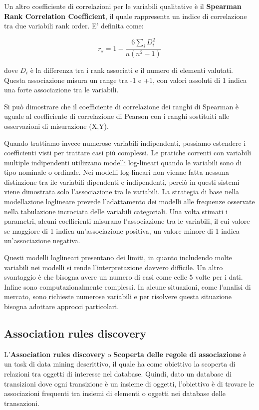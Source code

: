 \documentclass[a4paper]{extarticle}
\begin{document}
Un altro coefficiente di correlazioni per le variabili qualitative è il \textbf{Spearman Rank Correlation Coefficient}, il quale rappresenta un indice di correlazione tra due variabili rank order. E' definita come:

\begin{equation*}
r_s = 1 - \dfrac{6\sum_i D_i^2}{n(n^2-1)}
\end{equation*}

dove $D_i$ è la differenza tra i rank associati e il numero di elementi valutati. Questa associazione misura un range tra -1 e +1, con valori assoluti di 1 indica una forte associazione tra le variabili.

Si può dimostrare che il coefficiente di correlazione dei ranghi di Spearman è uguale al coefficiente di correlazione di Pearson con i ranghi sostituiti alle osservazioni di misurazione (X,Y).

Quando trattiamo invece numerose variabili indipendenti, possiamo estendere i coefficienti visti per trattare casi più complessi. Le pratiche correnti con variabili multiple indipendenti utilizzano modelli log-lineari quando le variabili sono di tipo nominale o ordinale. Nei modelli log-lineari non vienne fatta nessuna distinzione tra ile variabili dipendenti e indipendenti, perciò in questi sistemi viene dimostrata solo l'associazione tra le variabili. La strategia di base nella modellazione loglineare prevede l'adattamento dei modelli alle frequenze osservate nella tabulazione incrociata delle variabili categoriali. Una volta stimati i parametri, alcuni coefficienti misurano l'associazione tra le variabili, il cui valore se maggiore di 1 indica un'associazione positiva, un valore minore di 1 indica un'associazione negativa.

Questi modelli loglineari presentano dei limiti, in quanto includendo molte variabili nei modelli si rende l'interpretazione davvero difficile. Un altro svantaggio è che bisogna avere un numero di casi come celle 5 volte per i dati. Infine sono computazionalmente complessi. In alcune situazioni, come l'analisi di mercato, sono richieste numerose variabili e per risolvere questa situazione bisogna adottare approcci particolari.

\subsection{Association rules discovery}

L'\textbf{Association rules discovery} o \textbf{Scoperta delle regole di associazione} è un task di data mining descrittivo, il quale ha come obiettivo la scoperta di relazioni tra oggetti di interesse nel database. Quindi, dato un database di transizioni dove ogni transizione è un insieme di oggetti, l'obiettivo è di trovare le associazioni frequenti tra insiemi di elementi o oggetti nei database delle transazioni.
\end{document}
